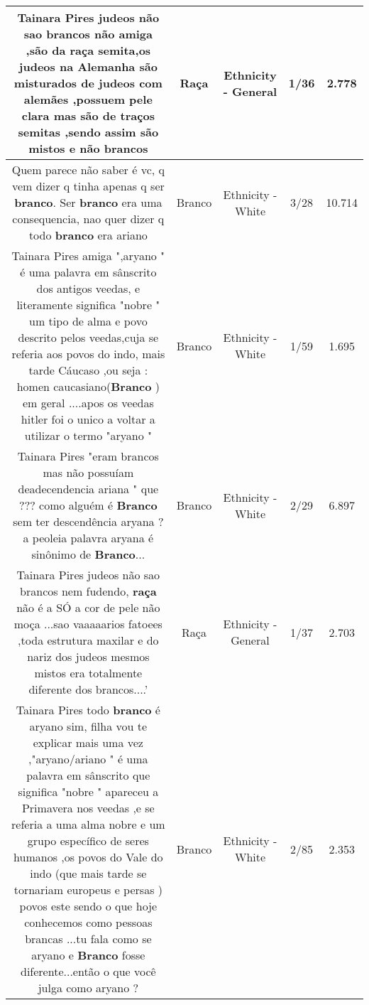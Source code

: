 \documentclass[11pt]{article}
\newlength\mylength
\begin{document}
\begin{center}
\begin{longtable}{|C{.65\mylength}|C{.30\mylength}|C{.12\mylength}|C{.12\mylength}|C{.12\mylength}|}
  \small Tainara Pires judeos não sao brancos não amiga ,são da \textbf{raça} semita,os judeos na Alemanha são misturados de judeos com alemães ,possuem pele clara mas são de traços semitas ,sendo assim são mistos e não brancos\normalsize   & Raça & Ethnicity - General & 1/36 & 2.778 \\  \hline
  \small Quem parece não saber é vc, q vem dizer q tinha apenas q ser \textbf{branco}. Ser \textbf{branco} era uma consequencia, nao quer dizer q todo \textbf{branco} era ariano\normalsize   & Branco & Ethnicity - White & 3/28 & 10.714 \\  \hline
  \small Tainara Pires amiga ",aryano " é uma palavra em sânscrito dos antigos veedas, e literamente significa "nobre " um tipo de alma e povo descrito pelos veedas,cuja se referia aos povos do indo, mais tarde Cáucaso ,ou seja : homen caucasiano(\textbf{Branco} ) em geral ....apos os veedas hitler foi o unico a voltar a utilizar o termo "aryano "\normalsize   & Branco & Ethnicity - White & 1/59 & 1.695 \\  \hline
  \small Tainara Pires "eram brancos mas não possuíam deadecendencia ariana " que ??? como alguém é \textbf{Branco} sem ter descendência aryana ? a peoleia palavra aryana é sinônimo de \textbf{Branco}...\normalsize   & Branco & Ethnicity - White & 2/29 & 6.897 \\  \hline
  \small Tainara Pires judeos não sao brancos nem fudendo, \textbf{raça} não é a SÓ a cor de pele não moça ...sao vaaaaarios fatoees ,toda estrutura maxilar e do nariz dos judeos mesmos mistos era totalmente diferente dos brancos....'\normalsize   & Raça & Ethnicity - General & 1/37 & 2.703 \\  \hline
  \small Tainara Pires todo \textbf{branco} é aryano sim, filha vou te explicar mais uma vez ,"aryano/ariano " é uma palavra  em sânscrito que significa "nobre " apareceu a Primavera nos veedas ,e se referia a uma alma nobre e um grupo específico de seres humanos ,os povos do Vale do indo (que mais tarde se tornariam europeus e persas ) povos este sendo o que hoje conhecemos como pessoas brancas ...tu fala como se aryano e \textbf{Branco} fosse diferente...então o que você julga como aryano ?\normalsize   & Branco & Ethnicity - White & 2/85 & 2.353 \\  \hline

\end{longtable}
\end{center}
\end{document}
